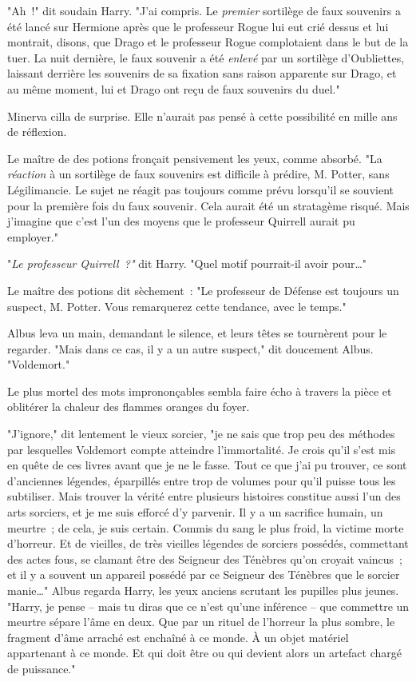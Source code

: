 "Ah~!" dit soudain Harry. "J'ai compris. Le \emph{premier} sortilège de faux souvenirs a été lancé sur Hermione après que le professeur Rogue lui eut crié dessus et lui montrait, disons, que Drago et le professeur Rogue complotaient dans le but de la tuer. La nuit dernière, le faux souvenir a été \emph{enlevé} par un sortilège d'Oubliettes, laissant derrière les souvenirs de sa fixation sans raison apparente sur Drago, et au même moment, lui et Drago ont reçu de faux souvenirs du duel."

Minerva cilla de surprise. Elle n'aurait pas pensé à cette possibilité en mille ans de réflexion.

Le maître de des potions fronçait pensivement les yeux, comme absorbé. "La \emph{réaction} à un sortilège de faux souvenirs est difficile à prédire, M. Potter, sans Légilimancie. Le sujet ne réagit pas toujours comme prévu lorsqu'il se souvient pour la première fois du faux souvenir. Cela aurait été un stratagème risqué. Mais j'imagine que c'est l'un des moyens que le professeur Quirrell aurait pu employer."

"\emph{Le professeur Quirrell~?"} dit Harry. "Quel motif pourrait-il avoir pour…"

Le maître des potions dit sèchement~: "Le professeur de Défense est toujours un suspect, M. Potter. Vous remarquerez cette tendance, avec le temps."

Albus leva un main, demandant le silence, et leurs têtes se tournèrent pour le regarder. "Mais dans ce cas, il y a un autre suspect," dit doucement Albus. "Voldemort."

Le plus mortel des mots imprononçables sembla faire écho à travers la pièce et oblitérer la chaleur des flammes oranges du foyer.

"J'ignore," dit lentement le vieux sorcier, "je ne sais que trop peu des méthodes par lesquelles Voldemort compte atteindre l'immortalité. Je crois qu'il s'est mis en quête de ces livres avant que je ne le fasse. Tout ce que j'ai pu trouver, ce sont d'anciennes légendes, éparpillés entre trop de volumes pour qu'il puisse tous les subtiliser. Mais trouver la vérité entre plusieurs histoires constitue aussi l'un des arts sorciers, et je me suis efforcé d'y parvenir. Il y a un sacrifice humain, un meurtre~; de cela, je suis certain. Commis du sang le plus froid, la victime morte d'horreur. Et de vieilles, de très vieilles légendes de sorciers possédés, commettant des actes fous, se clamant être des Seigneur des Ténèbres qu'on croyait vaincus~; et il y a souvent un appareil possédé par ce Seigneur des Ténèbres que le sorcier manie…" Albus regarda Harry, les yeux anciens scrutant les pupilles plus jeunes. "Harry, je pense -- mais tu diras que ce n'est qu'une inférence -- que commettre un meurtre sépare l'âme en deux. Que par un rituel de l'horreur la plus sombre, le fragment d'âme arraché est enchaîné à ce monde. À un objet matériel appartenant à ce monde. Et qui doit être ou qui devient alors un artefact chargé de puissance."


